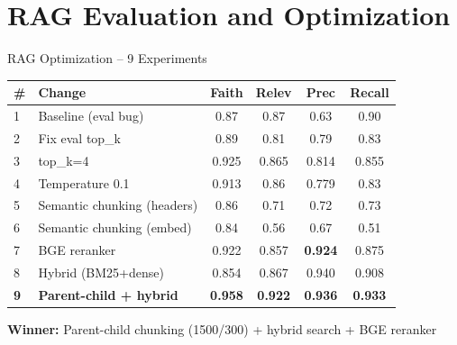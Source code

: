 \documentclass[aspectratio=169]{beamer}
\begin{document}
\section{RAG Evaluation and Optimization}

\begin{frame}{RAG Optimization -- 9 Experiments}
\begin{table}
\centering
\tiny
\begin{tabular}{llcccc}
\toprule
\textbf{\#} & \textbf{Change} & \textbf{Faith} & \textbf{Relev} & \textbf{Prec} & \textbf{Recall} \\
\midrule
1 & Baseline (eval bug) & 0.87 & 0.87 & 0.63 & 0.90 \\
2 & Fix eval top\_k & 0.89 & 0.81 & 0.79 & 0.83 \\
3 & top\_k=4 & 0.925 & 0.865 & 0.814 & 0.855 \\
4 & Temperature 0.1 & 0.913 & 0.86 & 0.779 & 0.83 \\
5 & Semantic chunking (headers) & 0.86 & 0.71 & 0.72 & 0.73 \\
6 & Semantic chunking (embed) & 0.84 & 0.56 & 0.67 & 0.51 \\
7 & BGE reranker & 0.922 & 0.857 & \textbf{0.924} & 0.875 \\
8 & Hybrid (BM25+dense) & 0.854 & 0.867 & 0.940 & 0.908 \\
\textbf{9} & \textbf{Parent-child + hybrid} & \textbf{0.958} & \textbf{0.922} & \textbf{0.936} & \textbf{0.933} \\
\bottomrule
\end{tabular}
\end{table}

\vspace{0.5em}
\textbf{Winner:} Parent-child chunking (1500/300) + hybrid search + BGE reranker
\end{frame}
\end{document}
